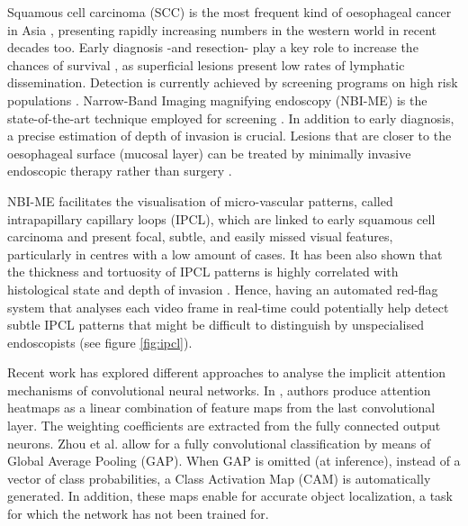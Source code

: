 \documentclass[runningheads]{llncs}
\begin{document}
Squamous cell carcinoma (SCC) is the most frequent kind of oesophageal cancer in Asia \cite{Wang2004}, presenting rapidly increasing numbers in the western world in recent decades too. Early diagnosis -and resection- play a key role to increase the chances of survival \cite{Endo1997}, as superficial lesions present low rates of lymphatic dissemination. Detection is currently achieved by screening programs on high risk populations \cite{Wang2004}. Narrow-Band Imaging magnifying endoscopy (NBI-ME) is the state-of-the-art technique employed for screening \cite{Oyama2017}. In addition to early diagnosis, a precise estimation of depth of invasion is crucial. Lesions that are closer to the oesophageal surface (mucosal layer) can be treated by minimally invasive endoscopic therapy rather than surgery \cite{Ono2006}.

NBI-ME facilitates the visualisation of micro-vascular patterns, called intrapapillary capillary loops (IPCL), which are linked to early squamous cell carcinoma and present focal, subtle, and easily missed visual features, particularly in centres with a low amount of cases. It has been also shown that the thickness and tortuosity of IPCL patterns is highly correlated with histological state and depth of invasion \cite{Oyama2017}. Hence, having an automated red-flag system that analyses each video frame in real-time could potentially help detect subtle IPCL patterns that might be difficult to distinguish by unspecialised endoscopists (see figure \ref{fig:ipcl}).

Recent work has explored different approaches to analyse the implicit attention mechanisms of convolutional neural networks. In \cite{Given2013}, authors produce attention heatmaps as a linear combination of feature maps from the last convolutional layer. The weighting coefficients are extracted from the fully connected output neurons. Zhou et al. \cite{Zhou2015} allow for a fully convolutional classification by means of Global Average Pooling (GAP). When GAP is omitted (at inference), instead of a vector of class probabilities, a Class Activation Map (CAM) is automatically generated. In addition, these maps enable for accurate object localization, a task for which the network has not been trained for. %
\end{document}
